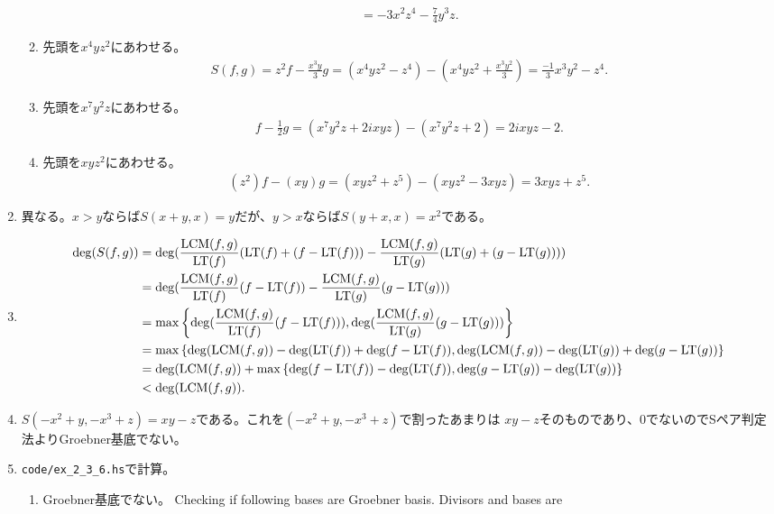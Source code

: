 \begin{enumerate}[label=(問題 \arabic*)]
\begin{enumerate}[label=(\alph*)]
\begin{align}
      =
      -3x^2z^4 - \frac{7}{4}y^3z.
    \end{align}
    \item 先頭を$x^4yz^2$にあわせる。
    \begin{align}
      S(f,g)
      =
      z^2f - \frac{x^3y}{3}g
      =
      (x^4yz^2 - z^4) - (x^4yz^2 + \frac{x^3y^2}{3})
      =
      \frac{-1}{3}x^3y^2 -z^4.
    \end{align}
    \item 先頭を$x^7y^2z$にあわせる。
    \begin{align}
      f- \frac{1}{2}g =
      (x^7y^2z+2ixyz) - (x^7y^2z + 2)
      =
      2ixyz - 2.
    \end{align}
    \item 先頭を$xyz^2$にあわせる。
    \begin{align}
      (z^2)f - (xy)g
      =
      (xyz^2+z^5) - (xyz^2-3xyz)
      =
      3xyz + z^5.
    \end{align}
  \end{enumerate}
  \item
  異なる。$x>y$ならば$S(x+y,x)=y$だが、$y>x$ならば$S(y+x,x)= x^2$である。
  \item
  \begin{align}
    \deg(S(f,g))
    &=
    \deg(\frac{\mathrm{LCM}(f,g)}{{\rm LT}(f)}({\rm LT}(f)+(f-{\rm LT}(f))) - \frac{\mathrm{LCM}(f,g)}{{\rm LT}(g)}({\rm LT}(g)+(g-{\rm LT}(g))))\\
    &=
    \deg(\frac{\mathrm{LCM}(f,g)}{{\rm LT}(f)}(f-{\rm LT}(f)) - \frac{\mathrm{LCM}(f,g)}{{\rm LT}(g)}(g-{\rm LT}(g)))\\
    &=
    \max\left\{\deg(\frac{\mathrm{LCM}(f,g)}{{\rm LT}(f)}(f-{\rm LT}(f))), \deg(\frac{\mathrm{LCM}(f,g)}{{\rm LT}(g)}(g-{\rm LT}(g)))\right\}\\
    &=
    \max\left\{\deg(\mathrm{LCM}(f,g))-\deg({\rm LT}(f))+\deg(f-{\rm LT}(f)),
    \deg(\mathrm{LCM}(f,g))-\deg({\rm LT}(g))+\deg(g-{\rm LT}(g))\right\}\\
    &=
    \deg(\mathrm{LCM}(f,g)) + \max\left\{\deg(f-{\rm LT}(f))-\deg({\rm LT}(f)), \deg(g-{\rm LT}(g))-\deg({\rm LT}(g))\right\}\\
    &<
    \deg(\mathrm{LCM}(f,g)).
  \end{align}
  \item
  $S(-x^2+y,-x^3+z) = xy-z$である。これを$(-x^2+y,-x^3+z)$で割ったあまりは
  $xy-z$そのものであり、0でないのでSペア判定法よりGroebner基底でない。
  \item   {\tt code/ex_2_3_6.hs}で計算。
  \begin{enumerate}[label=(\alph*)]
    \item
      Groebner基底でない。
      Checking if following bases are Groebner basis.
      Divisors and bases are

\end{enumerate}
\end{enumerate}

